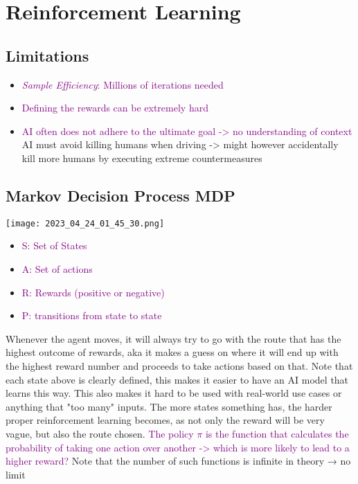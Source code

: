 \documentclass[main.tex,fontsize=8pt,paper=a4,paper=portrait,DIV=calc,]{scrartcl}
\begin{document}
\section{Reinforcement Learning}
\subsection{Limitations}
\begin{itemize}
  \item \textcolor{purple}{\emph{Sample Efficiency}: Millions of iterations needed}
\item \textcolor{purple}{Defining the rewards can be extremely hard}
\item \textcolor{purple}{AI often does not adhere to the ultimate goal -> no understanding of context}\newline
  AI must avoid killing humans when driving -> might however accidentally kill more humans by executing extreme countermeasures
\end{itemize} 

\subsection{Markov Decision Process MDP}
\texttt{[image: 2023\_04\_24\_01\_45\_30.png]}\newline
\begin{itemize}
\item \textcolor{purple}{S: Set of States}
\item \textcolor{purple}{A: Set of actions}
\item \textcolor{purple}{R: Rewards (positive or negative)}
\item \textcolor{purple}{P: transitions from state to state}
\end{itemize} 
Whenever the agent moves, it will always try to go with the route that has the highest outcome of rewards, aka it makes a guess on where it will end up with the highest reward number and proceeds to take actions based on that.\newline
Note that each state above is clearly defined, this makes it easier to have an AI model that learns this way.\newline
This also makes it hard to be used with real-world use cases or anything that "too many" inputs.\newline
The more states something has, the harder proper reinforcement learning becomes, as not only the reward will be very vague, but also the route chosen.\newline
\textcolor{purple}{The policy \( \pi \) is the function that calculates the probability of taking one action over another -> which is more likely to lead to a higher reward?}\newline
Note that the number of such functions is infinite in theory → no limit
\end{document}
